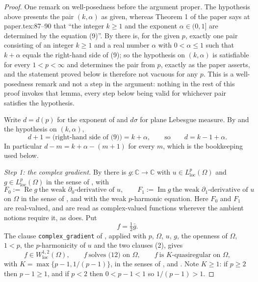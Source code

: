 \begin{proof}
One remark on well-posedness before the argument proper.  The hypothesis above
presents the pair $(k,\alpha)$ as given, whereas Theorem 1 of the paper says at
paper.tex:87--90 that ``the integer $k\ge1$ and the exponent $\alpha\in(0,1]$
are determined by the equation (9)''.  By  there is,
for the given $p$, exactly one pair consisting of an integer $k\ge1$ and a real
number $\alpha$ with $0<\alpha\le1$ such that $k+\alpha$ equals the right-hand
side of (9); so the hypothesis on $(k,\alpha)$ is satisfiable for every
$1<p<\infty$ and determines the pair from $p$, exactly as the paper asserts, and
the statement proved below is therefore not vacuous for any $p$.  This is a
well-posedness remark and not a step in the argument: nothing in the rest of
this proof invokes that lemma, every step below being valid for whichever pair
satisfies the hypothesis.

Write $d=d(p)$ for the exponent of  and $d\sigma$ for plane
Lebesgue measure.  By  and the hypothesis on
$(k,\alpha)$,
\begin{equation}\tag{1}
  d+1=\text{(right-hand side of (9))}=k+\alpha,\qquad\text{so}\qquad
  d=k-1+\alpha .
\end{equation}
In particular $d-m=k+\alpha-(m+1)$ for every $m$, which is the bookkeeping used
below.

\emph{Step 1: the complex gradient.}  By  there is
$g\colon\mathbb{C}\to\mathbb{C}$ with
$u\in L^{p}_{\mathrm{loc}}(\Omega)$ and $g\in L^{p}_{\mathrm{loc}}(\Omega)$ in
the sense of , with
\begin{equation}\tag{2}
  F_0:=\operatorname{Re}g\ \text{the weak }\partial_0\text{-derivative of }u,
  \qquad
  F_1:=\operatorname{Im}g\ \text{the weak }\partial_1\text{-derivative of }u
\end{equation}
on $\Omega$ in the sense of , and with the weak
$p$-harmonic equation.  Here $F_0$ and $F_1$ are real-valued, and are read as
complex-valued functions wherever the ambient notions require it, as
 does.  Put
\[
  f=\tfrac12\bar g .
\]
The clause \texttt{complex\_gradient} of , applied with
$p$, $\Omega$, $u$, $g$, the openness of $\Omega$, $1<p$, the
$p$-harmonicity of $u$ and the two clauses (2), gives
\begin{equation}\tag{3}
  f\in W^{1,2}_{\mathrm{loc}}(\Omega),\qquad
  f\ \text{solves (12) on }\Omega,\qquad
  f\ \text{is }K\text{-quasiregular on }\Omega,
\end{equation}
with $K=\max\{p-1,1/(p-1)\}$, in the senses of ,
 and .  Note $K\ge1$: if $p\ge2$
then $p-1\ge1$, and if $p<2$ then $0<p-1<1$ so $1/(p-1)>1$.


\end{proof}
